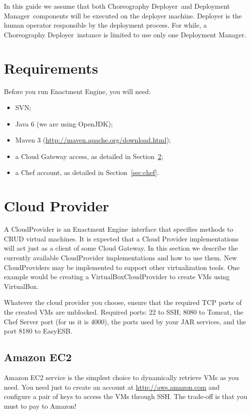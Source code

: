 \documentclass[a4paper, 10pt]{article}
\newcommand{\ee}{Enactment Engine}
\newcommand{\cd}{Choreography Deployer}
\newcommand{\dm}{Deployment Manager}
\begin{document}
In this guide we assume that both \cd\ and \dm\ components will be executed on the deployer machine. Deployer is the human operator responsible by the deployment process. For while, a \cd\ instance is limited to use only one \dm.

\section{Requirements}

Before you run \ee, you will need:

\begin{itemize}
\item SVN;
\item Java 6 (we are using OpenJDK);
\item Maven 3  (\url{http://maven.apache.org/download.html});
\item a Cloud Gateway access, as detailed in Section~\ref{sec:cloud};
\item a Chef account, as detailed in Section~\ref{sec:chef}.
\end{itemize}

\section{Cloud Provider}
\label{sec:cloud}

A \textsf{CloudProvider} is an \ee\ interface that specifies methods to CRUD virtual machines. It is expected that a \textsf{Cloud Provider} implementations will act just as a client of some Cloud Gateway. In this section we describe the currently available \textsf{CloudProvider} implementations and how to use them. New \textsf{CloudProvider}s may be implemented to support other virtualization tools. One example would be creating a \textsf{VirtualBoxCloudProvider} to create VMs using VirtualBox.

Whatever the cloud provider you choose, ensure that the required TCP ports of the created VMs are unblocked. Required ports: 22 to SSH, 8080 to Tomcat, the Chef Server port (for us it is 4000), the ports used by your JAR services, and the port 8180 to EasyESB.

\subsection{Amazon EC2}

Amazon EC2 service is the simplest choice to dynamically retrieve VMs as you need. You need just to create an account at \url{http://aws.amazon.com} and configure a pair of keys to access the VMs through SSH. The trade-off is that you must to pay to Amazon! 
\end{document}
